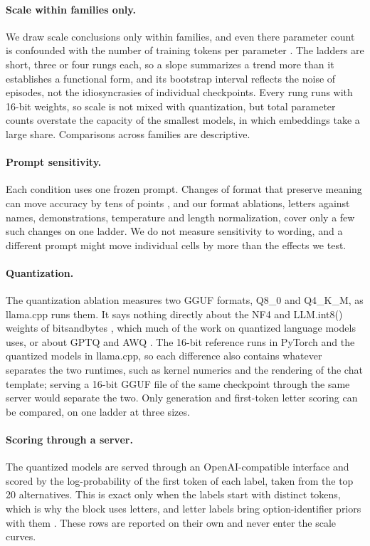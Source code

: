 \paragraph{Scale within families only.}
We draw scale conclusions only within families, and even there parameter count is confounded with the number of training tokens per parameter \citep{hoffmann2022chinchilla,kumar2025precision}. The ladders are short, three or four rungs each, so a slope summarizes a trend more than it establishes a functional form, and its bootstrap interval reflects the noise of episodes, not the idiosyncrasies of individual checkpoints. Every rung runs with 16-bit weights, so scale is not mixed with quantization, but total parameter counts overstate the capacity of the smallest models, in which embeddings take a large share. Comparisons across families are descriptive.

\paragraph{Prompt sensitivity.}
Each condition uses one frozen prompt. Changes of format that preserve meaning can move accuracy by tens of points \citep{sclar2024formatting}, and our format ablations, letters against names, demonstrations, temperature and length normalization, cover only a few such changes on one ladder. We do not measure sensitivity to wording, and a different prompt might move individual cells by more than the effects we test.

\paragraph{Quantization.}
The quantization ablation measures two GGUF formats, Q8\_0 and Q4\_K\_M, as llama.cpp runs them. It says nothing directly about the NF4 and LLM.int8() weights of bitsandbytes \citep{dettmers2023qlora,dettmers2022llmint8}, which much of the work on quantized language models uses, or about GPTQ and AWQ \citep{frantar2023gptq,lin2024awq}. The 16-bit reference runs in PyTorch and the quantized models in llama.cpp, so each difference also contains whatever separates the two runtimes, such as kernel numerics and the rendering of the chat template; serving a 16-bit GGUF file of the same checkpoint through the same server would separate the two. Only generation and first-token letter scoring can be compared, on one ladder at three sizes.

\paragraph{Scoring through a server.}
The quantized models are served through an OpenAI-compatible interface and scored by the log-probability of the first token of each label, taken from the top 20 alternatives. This is exact only when the labels start with distinct tokens, which is why the block uses letters, and letter labels bring option-identifier priors with them \citep{zheng2024selectors}. These rows are reported on their own and never enter the scale curves.

